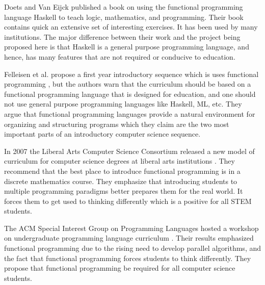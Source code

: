 Doets and Van Eijck published a book \cite{Doets:2004} on using the
functional programming language Haskell to teach logic, mathematics,
and programming.  Their book contains quick an extensive set of
interesting exercises.  It has been used by many institutions.  The
major difference between their work and the project being proposed
here is that Haskell is a general purpose programming language, and
hence, has many features that are not required or conducive to
education.

Felleisen et al. propose a first year introductory sequence which is
uses functional programming
\cite{FELLEISEN_FINDLER_FLATT_KRISHNAMURTHI_2004}, but the authors
warn that the curriculum should be based on a functional programming
language that is designed for education, and one should not use
general purpose programming languages like Haskell, ML, etc.  They
argue that functional programming languages provide a natural
environment for organizing and structuring programs which they claim
are the two most important parts of an introductory computer science
sequence.

In 2007 the Liberal Arts Computer Science Consortium released a new
model of curriculum for computer science degrees at liberal arts
institutions \cite{LiberalArtsComputerScienceConsortium:2007}.  They
recommend that the best place to introduce functional programming is
in a discrete mathematics course.  They emphasize that introducing
students to multiple programming paradigms better prepares them for
the real world. It forces them to get used to thinking differently
which is a positive for all STEM students.

The ACM Special Interest Group on Programming Languages hosted a
workshop on undergraduate programming language curriculum
\cite{Allen:2008}.  Their results emphasized functional programming
due to the rising need to develop parallel algorithms, and the fact
that functional programming forces students to think differently.
They propose that functional programming be required for all computer
science students.

